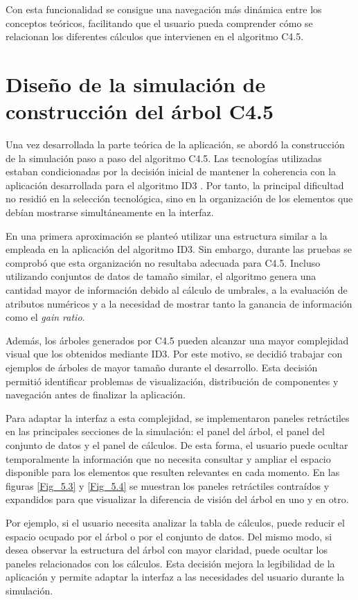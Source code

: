 Con esta funcionalidad se consigue una navegación más dinámica entre los conceptos teóricos, facilitando que el usuario pueda comprender cómo se relacionan los diferentes cálculos que intervienen en el algoritmo C4.5.

\section{Diseño de la simulación de construcción del árbol C4.5}

Una vez desarrollada la parte teórica de la aplicación, se abordó la construcción de la simulación paso a paso del algoritmo C4.5. Las tecnologías utilizadas estaban condicionadas por la decisión inicial de mantener la coherencia con la aplicación desarrollada para el algoritmo ID3 \cite{drefs2026DecisionTreeSimulator}. Por tanto, la principal dificultad no residió en la selección tecnológica, sino en la organización de los elementos que debían mostrarse simultáneamente en la interfaz.

En una primera aproximación se planteó utilizar una estructura similar a la empleada en la aplicación del algoritmo ID3. Sin embargo, durante las pruebas se comprobó que esta organización no resultaba adecuada para C4.5. Incluso utilizando conjuntos de datos de tamaño similar, el algoritmo genera una cantidad mayor de información debido al cálculo de umbrales, a la evaluación de atributos numéricos y a la necesidad de mostrar tanto la ganancia de información como el \textit{gain ratio}.

Además, los árboles generados por C4.5 pueden alcanzar una mayor complejidad visual que los obtenidos mediante ID3. Por este motivo, se decidió trabajar con ejemplos de árboles de mayor tamaño durante el desarrollo. Esta decisión permitió identificar problemas de visualización, distribución de componentes y navegación antes de finalizar la aplicación.

Para adaptar la interfaz a esta complejidad, se implementaron paneles retráctiles en las principales secciones de la simulación: el panel del árbol, el panel del conjunto de datos y el panel de cálculos. De esta forma, el usuario puede ocultar temporalmente la información que no necesita consultar y ampliar el espacio disponible para los elementos que resulten relevantes en cada momento. En las figuras \ref{Fig_5.3} y \ref{Fig_5.4} se muestran los paneles retráctiles contraídos y expandidos para que visualizar la diferencia de visión del árbol en uno y en otro.

Por ejemplo, si el usuario necesita analizar la tabla de cálculos, puede reducir el espacio ocupado por el árbol o por el conjunto de datos. Del mismo modo, si desea observar la estructura del árbol con mayor claridad, puede ocultar los paneles relacionados con los cálculos. Esta decisión mejora la legibilidad de la aplicación y permite adaptar la interfaz a las necesidades del usuario durante la simulación.


